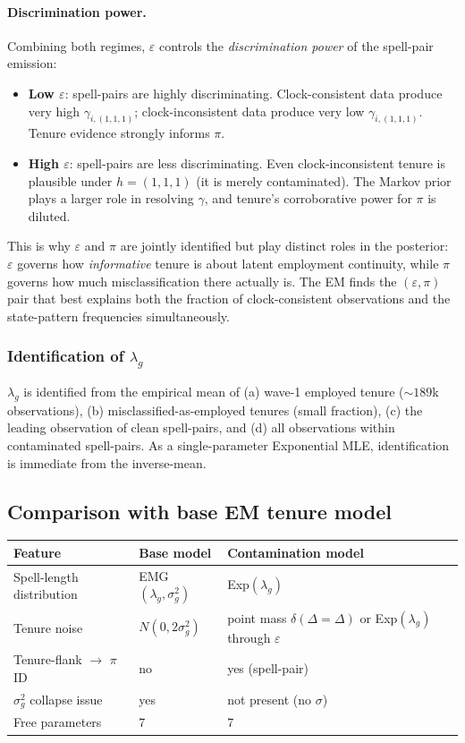 \paragraph{Discrimination power.}
Combining both regimes, \(\varepsilon\) controls the \emph{discrimination
power} of the spell-pair emission:
\begin{itemize}
\item \textbf{Low \(\varepsilon\)}: spell-pairs are highly
  discriminating. Clock-consistent data produce very high
  \(\gamma_{i,(1,1,1)}\); clock-inconsistent data produce very low
  \(\gamma_{i,(1,1,1)}\). Tenure evidence strongly informs \(\pi\).
\item \textbf{High \(\varepsilon\)}: spell-pairs are less
  discriminating. Even clock-inconsistent tenure is plausible under
  \(h = (1,1,1)\) (it is merely contaminated). The Markov prior
  plays a larger role in resolving \(\gamma\), and tenure's
  corroborative power for \(\pi\) is diluted.
\end{itemize}
This is why \(\varepsilon\) and \(\pi\) are jointly identified but play
distinct roles in the posterior: \(\varepsilon\) governs how
\emph{informative} tenure is about latent employment continuity, while
\(\pi\) governs how much misclassification there actually is. The EM
finds the \((\varepsilon, \pi)\) pair that best explains both the
fraction of clock-consistent observations and the state-pattern
frequencies simultaneously.

\subsubsection{Identification of \(\lambda_g\)}

\(\lambda_g\) is identified from the empirical mean of (a) wave-1 employed
tenure (\(\sim 189\)k observations), (b) misclassified-as-employed tenures
(small fraction), (c) the leading observation of clean spell-pairs, and
(d) all observations within contaminated spell-pairs. As a single-parameter
Exponential MLE, identification is immediate from the inverse-mean.

\subsection{Comparison with base EM tenure model}
\label{sec:design_choices}

\begin{center}
\begin{tabular}{llll}
\toprule
Feature & Base model & Contamination model \\
\midrule
Spell-length distribution & EMG\((\lambda_g,\sigma_g^2)\) & Exp\((\lambda_g)\) \\
Tenure noise & \(N(0,2\sigma_g^2)\) & point mass \(\delta(\Delta=\Delta)\) or Exp\((\lambda_g)\) through \(\varepsilon\) \\
Tenure-flank \(\to\) \(\pi\) ID & no & yes (spell-pair) \\
\(\sigma_g^2\) collapse issue & yes &  not present (no \(\sigma\)) \\
Free parameters & 7 & 7 \\
\bottomrule
\end{tabular}
\end{center}

